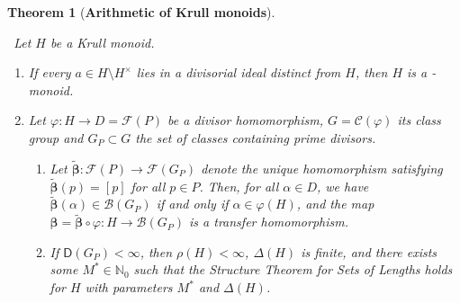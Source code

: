 \documentclass[a4paper]{amsart}
\newtheorem{theorem}{Theorem}[section]
\theoremstyle{definition}
\numberwithin{equation}{section}
\begin{document}
\medskip
\begin{theorem}[\bf Arithmetic of Krull monoids] \label{6.5}~

\noindent \ Let $H$ be a  Krull monoid.
\begin{enumerate}
\item If every $a \in H \setminus H^{\times}$ lies in a divisorial ideal distinct from $H$, then $H$ is a {}-monoid.

\smallskip
\item Let  $\varphi \colon H \to D = \mathcal F (P)$ be a  divisor
      homomorphism, $G = \mathcal C (\varphi)$ its class group and $G_P
      \subset G$ the set of classes containing prime divisors.
      \begin{enumerate}
      \smallskip
      \item Let $\widetilde{\boldsymbol \beta} \colon \mathcal F (P) \to \mathcal F (G_P)$
            denote the unique homomorphism satisfying $\widetilde{\boldsymbol \beta} (p) = [p]$ for
            all $p \in P$. Then, for all $\alpha \in D$, we have
            $\widetilde{\boldsymbol \beta} (\alpha) \in \mathcal B (G_P)$
            if and only if $\alpha \in \varphi (H)$, and the map
            $\boldsymbol \beta = \widetilde{\boldsymbol \beta} \circ \varphi \colon H \to \mathcal B (G_P)$ is a transfer
            homomorphism.

      \smallskip
      \item If $\mathsf D (G_P) < \infty$, then $\rho (H) < \infty$,
            $\Delta (H)$ is finite, and there exists some $M^* \in \mathbb
            N_0$ such that the Structure Theorem for Sets of Lengths holds
            for $H$ with parameters $M^*$ and  $\Delta (H)$.
      \end{enumerate}
\end{enumerate}
\end{theorem}
\end{document}
